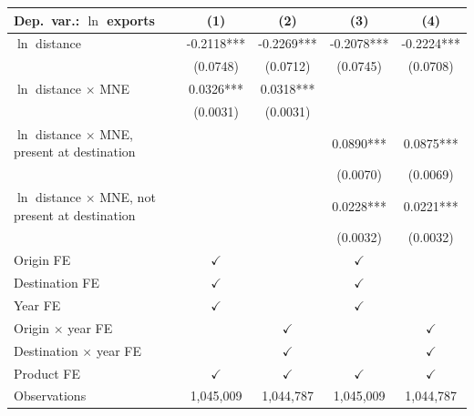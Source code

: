 \begin{tabular}{lcccc} \hline
Dep.\ var.: $\ln$ exports & (1) & (2) & (3) & (4) \\ \hline
$\ln$ distance & -0.2118*** & -0.2269*** & -0.2078*** & -0.2224*** \\
 & (0.0748) & (0.0712) & (0.0745) & (0.0708) \\
$\ln$ distance $\times$ MNE & 0.0326*** & 0.0318*** &  &  \\
 & (0.0031) & (0.0031) &  &  \\
$\ln$ distance $\times$ MNE, present at destination &  &  & 0.0890*** & 0.0875*** \\
 &  &  & (0.0070) & (0.0069) \\
$\ln$ distance $\times$ MNE, not present at destination &  &  & 0.0228*** & 0.0221*** \\
 &  &  & (0.0032) & (0.0032) \\
\hline
Origin FE & $\checkmark$ &  & $\checkmark$ &  \\
Destination FE & $\checkmark$ &  & $\checkmark$ &  \\
Year FE & $\checkmark$ &  & $\checkmark$ &  \\
Origin $\times$ year FE &  & $\checkmark$ &  & $\checkmark$ \\
Destination $\times$ year FE &  & $\checkmark$ &  & $\checkmark$ \\
Product FE & $\checkmark$ & $\checkmark$ & $\checkmark$ & $\checkmark$ \\
\hline
Observations & 1,045,009 & 1,044,787 & 1,045,009 & 1,044,787 \\
\hline
\end{tabular}

